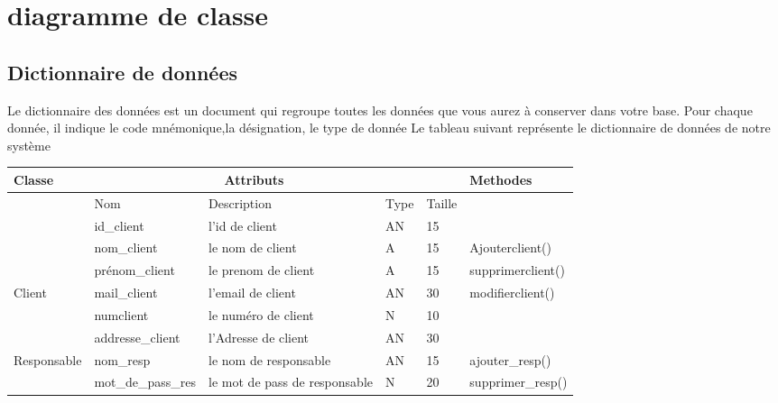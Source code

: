 \documentclass[edit,12pt,a4paper,ChapStyle,oneside,doubleinterligne]{report}
\begin{document}
\section{diagramme de classe}
\subsection{Dictionnaire de données}
Le dictionnaire des données est un document qui regroupe toutes les données que vous
aurez à conserver dans votre base. Pour chaque donnée, il indique le code mnémonique,la
désignation, le type de donnée
\newline Le tableau suivant représente le dictionnaire de données de notre système 
\begin{table}[h!]
    \centering
    \begin{tabular}{ | m{} | m{}| m{3cm} |m{}|m{}|l|}
    \hline
         Classe&\multicolumn{3}{c}{Attributs}&\phantom{h} &Methodes\\
         \hline &Nom&Description&Type&Taille&\\\cline{2-5}
                                        &id\_client    &l'id de client&AN&15& \\\cline{2-6}
                                        &nom\_client   &le nom de client&A&15&Ajouterclient() \\\cline{2-6}
                                        &prénom\_client&le prenom de client&A&15&supprimerclient() \\\cline{2-6}
                            Client      &mail\_client  &l'email de client&AN&30&modifierclient() \\\cline{2-6}
                                        &numclient    &le numéro de client&N&10&\\\cline{2-5}
                                        &addresse\_client&l'Adresse de client&AN&30&\\\hline
                                        

                                        
                            Responsable &nom\_resp &le nom de responsable&AN&15&ajouter\_resp()\\\cline{2-6}
                            &mot\_de\_pass\_res&le mot de pass de responsable&N&20&supprimer\_resp()\\\hline

                

 \end{tabular}
 
\end{table}
\end{document}

